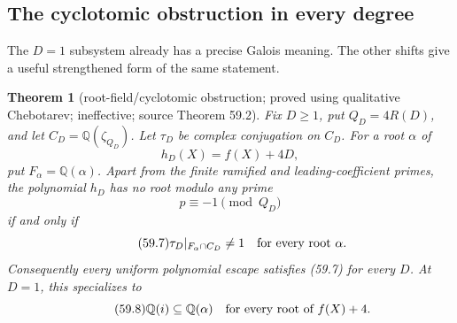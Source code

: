 \documentclass[10pt,reqno]{amsart}
\newtheorem{theorem}{Theorem}[section]
\theoremstyle{definition}
\newcommand{\1}{\mathbf 1}
\begin{document}
\subsection{The cyclotomic obstruction in every degree}
The $D=1$ subsystem already has a precise Galois meaning.  The other shifts
give a useful strengthened form of the same statement.

\begin{theorem}[root-field/cyclotomic obstruction; proved using qualitative
Chebotarev; ineffective; source Theorem 59.2]
\label{thm:cyclotomic-obstruction}
Fix $D\geq1$, put $Q_D=4R(D)$, and let
$C_D=\mathbb Q(\zeta_{Q_D})$.  Let $\tau_D$ be complex conjugation on
$C_D$.  For a root $\alpha$ of
\begin{equation}\tag{59.5}
                         h_D(X)=f(X)+4D,
\end{equation}
put $F_\alpha=\mathbb Q(\alpha)$.  Apart from the finite ramified and
leading-coefficient primes, the polynomial $h_D$ has no root modulo any
prime
\begin{equation}\tag{59.6}
                         p\equiv-1\pmod {Q_D}
\end{equation}
if and only if
\begin{equation}\tag{59.7}
 \tau_D|_{F_\alpha\cap C_D}\ne1
                 \quad\hbox{for every root }\alpha.
\end{equation}
Consequently every uniform polynomial escape satisfies (59.7) for every
$D$.  At $D=1$, this specializes to
\begin{equation}\tag{59.8}
              \mathbb Q(i)\subseteq\mathbb Q(\alpha)
       \quad\hbox{for every root of }f(X)+4.
\end{equation}
\end{theorem}
\end{document}
